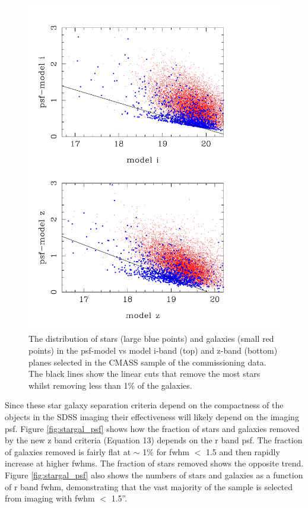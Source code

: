 \documentclass[preprint]{aastex}
\begin{document}
\begin{figure}
\includegraphics[width=0.95\columnwidth]{plots/star_gal_chunk2_paper}
\caption{The distribution of stars (large blue points) and galaxies (small red
points) in the psf-model vs model i-band (top) and z-band (bottom) planes
selected in the CMASS sample of the commissioning data. The black lines show the
linear cuts that remove the most stars whilst removing less than 1\% of the
galaxies.}
\label{fig:stargal}
\end{figure}


Since these star galaxy separation criteria depend on the compactness of the
objects in the SDSS imaging their effectiveness will likely depend on the
imaging psf. Figure \ref{fig:stargal_psf} shows how the fraction of stars and
galaxies removed by the new z band criteria (Equation 13) depends on the r band
psf. The fraction of galaxies removed is fairly flat at $\sim$ 1\% for fwhm $<$
1.5 and then rapidly increase at higher fwhms. The fraction of stars removed
shows the opposite trend. Figure \ref{fig:stargal_psf} also shows the numbers of
stars and galaxies as a function of r band fwhm, demonstrating that the vast
majority of the sample is selected from imaging with fwhm $<$ 1.5''.
\end{document}
